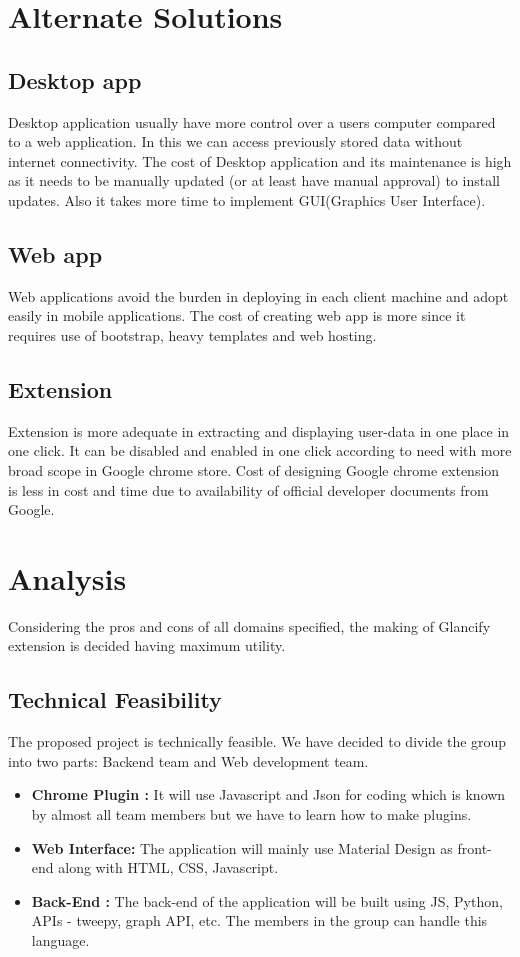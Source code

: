 \documentclass[12pt]{article}
\begin{document}
	    
	\section{Alternate Solutions}
	\subsection{Desktop app}
    Desktop application usually have more control over a users computer compared to a web application. In this we can access previously stored data without internet connectivity.
        The cost of Desktop application and its maintenance is high as it needs to be manually updated (or at least have manual approval) to install updates.
        Also it takes more time to implement GUI(Graphics User Interface).  
	\subsection{Web app}
	Web applications avoid the burden in deploying in each client machine and adopt easily in mobile applications. The cost of creating web app is more since it requires use of bootstrap, heavy templates and web hosting.
	\subsection{Extension}
	Extension is more adequate in extracting and displaying user-data in one place in one click. It can be disabled and enabled in one click according to need with more broad scope in Google chrome store.
	Cost of designing Google chrome extension is less in cost and time due to availability of official developer documents from Google.
	
	\section{Analysis}
	Considering the pros and cons of all domains specified, the making of Glancify extension is decided having maximum utility.    
	\subsection{Technical Feasibility}
	The proposed project is technically feasible. We have decided to divide the
group into two parts: Backend team and Web development team.\\ 
	\begin{itemize}
	    \item \textbf{Chrome Plugin :} It will use Javascript and Json for coding which is known by
almost all team members but we have to learn how to make plugins.
	\item \textbf{Web Interface:} The application will mainly use Material Design as front-end
along with HTML, CSS, Javascript.
	
	\item \textbf{Back-End :} The back-end of the application will be built using JS, Python, APIs - tweepy, graph API, etc. The members in the group can handle this
language.
    \end{itemize}
	
\end{document}

